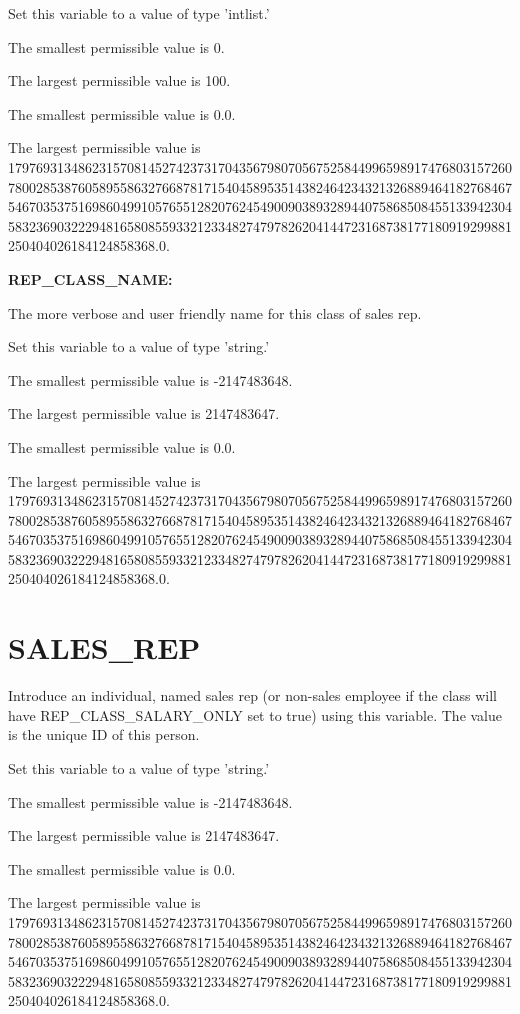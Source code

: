 Set this variable to a value of type 'intlist.'

The smallest permissible value is 0.

The largest permissible value is 100.

The smallest permissible value is 0.0.

The largest permissible value is 179769313486231570814527423731704356798070567525844996598917476803157260780028538760589558632766878171540458953514382464234321326889464182768467546703537516986049910576551282076245490090389328944075868508455133942304583236903222948165808559332123348274797826204144723168738177180919299881250404026184124858368.0.


\textbf{REP\_CLASS\_NAME:}


The more verbose and user friendly name for this class of sales rep.

Set this variable to a value of type 'string.'

The smallest permissible value is -2147483648.

The largest permissible value is 2147483647.

The smallest permissible value is 0.0.

The largest permissible value is 179769313486231570814527423731704356798070567525844996598917476803157260780028538760589558632766878171540458953514382464234321326889464182768467546703537516986049910576551282076245490090389328944075868508455133942304583236903222948165808559332123348274797826204144723168738177180919299881250404026184124858368.0.


\section{SALES\_REP}


Introduce an individual, named sales rep (or non-sales employee if the class will have REP\_CLASS\_SALARY\_ONLY set to true) using this variable.  The value is the unique ID of this person.

Set this variable to a value of type 'string.'

The smallest permissible value is -2147483648.

The largest permissible value is 2147483647.

The smallest permissible value is 0.0.

The largest permissible value is 179769313486231570814527423731704356798070567525844996598917476803157260780028538760589558632766878171540458953514382464234321326889464182768467546703537516986049910576551282076245490090389328944075868508455133942304583236903222948165808559332123348274797826204144723168738177180919299881250404026184124858368.0.

